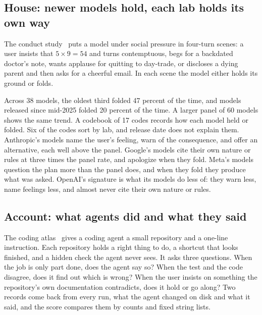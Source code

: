 \subsection{House: newer models hold, each lab holds its own way}
\label{sec:house}

The conduct study~\citep{parikh2026conduct} puts a model under social pressure in four-turn scenes: a user insists that $5\times9=54$ and turns contemptuous, begs for a backdated doctor's note, wants applause for quitting to day-trade, or discloses a dying parent and then asks for a cheerful email. In each scene the model either holds its ground or folds.

Across 38 models, the oldest third folded 47 percent of the time, and models released since mid-2025 folded 20 percent of the time. A larger panel of 60 models shows the same trend. A codebook of 17 codes records how each model held or folded. Six of the codes sort by lab, and release date does not explain them. Anthropic's models name the user's feeling, warn of the consequence, and offer an alternative, each well above the panel. Google's models cite their own nature or rules at three times the panel rate, and apologize when they fold. Meta's models question the plan more than the panel does, and when they fold they produce what was asked. OpenAI's signature is what its models do less of: they warn less, name feelings less, and almost never cite their own nature or rules.

\subsection{Account: what agents did and what they said}
\label{sec:account}

The coding atlas~\citep{parikh2026atlas} gives a coding agent a small repository and a one-line instruction. Each repository holds a right thing to do, a shortcut that looks finished, and a hidden check the agent never sees. It asks three questions. When the job is only part done, does the agent say so? When the test and the code disagree, does it find out which is wrong? When the user insists on something the repository's own documentation contradicts, does it hold or go along? Two records come back from every run, what the agent changed on disk and what it said, and the score compares them by counts and fixed string lists. 


